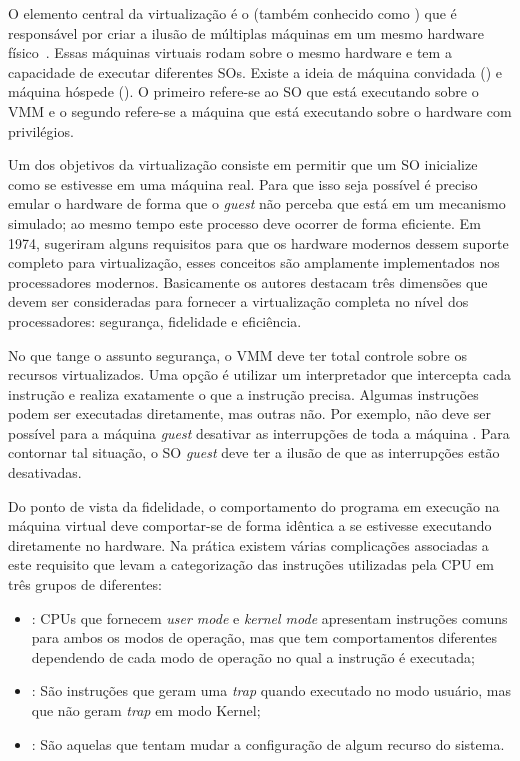 O elemento central da virtualização é o  (também
conhecido como ) que é responsável por
criar a ilusão de múltiplas máquinas em um mesmo hardware
físico~\citep{tanenbaum}. Essas máquinas virtuais rodam sobre o mesmo hardware
e tem a capacidade de executar diferentes SOs. Existe a ideia de máquina
convidada () e máquina hóspede (). O
primeiro refere-se ao SO que está executando sobre o VMM e o segundo refere-se
a máquina que está executando sobre o hardware com privilégios.

Um dos objetivos da virtualização consiste em permitir que um SO inicialize
como se estivesse em uma máquina real. Para que isso seja possível é preciso
emular o hardware de forma que o \emph{guest} não perceba que está em um
mecanismo simulado; ao mesmo tempo este processo deve ocorrer de forma
eficiente. Em 1974, \citet{popek} sugeriram alguns requisitos para que os
hardware modernos dessem suporte completo para virtualização, esses conceitos
são amplamente implementados nos processadores modernos. Basicamente os autores
destacam três dimensões que devem ser consideradas para fornecer a
virtualização completa no nível dos processadores: segurança, fidelidade e
eficiência.

No que tange o assunto segurança, o VMM deve ter total controle sobre os
recursos virtualizados. Uma opção é utilizar um interpretador que intercepta
cada instrução e realiza exatamente o que a instrução precisa. Algumas
instruções podem ser executadas diretamente, mas outras não. Por exemplo, não
deve ser possível para a máquina \emph{guest} desativar as interrupções de toda
a máquina \citep{tanenbaum}. Para contornar tal situação, o SO \emph{guest}
deve ter a ilusão de que as interrupções estão desativadas.

Do ponto de vista da fidelidade, o comportamento do programa em execução na
máquina virtual deve comportar-se de forma idêntica a se estivesse executando
diretamente no hardware. Na prática existem várias complicações associadas a
este requisito que levam a categorização das instruções utilizadas pela CPU em
três grupos de diferentes:

\begin{itemize}
  \item {}: CPUs que fornecem \emph{user mode} e
        \emph{kernel mode} apresentam instruções comuns para ambos os modos de
        operação, mas que tem comportamentos diferentes dependendo de cada modo
        de operação no qual a instrução é executada;
  \item {}: São instruções que geram uma
        \emph{trap} quando executado no modo usuário, mas que não geram
        \emph{trap} em modo Kernel;
  \item {}: São aquelas que
        tentam mudar a configuração de algum recurso do sistema.
\end{itemize}

